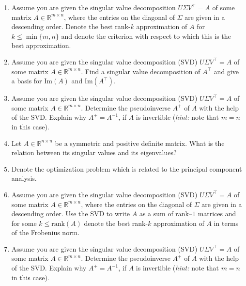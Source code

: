 \begin{enumerate}
	\item Assume you are given the singular value decomposition 
	$U \Sigma V^\top = A$ of some matrix $A \in \mathbb{R}^{m \times n}$, where the 
	entries on the diagonal of $\Sigma$ are given in a descending order.
	Denote the best rank-$k$ approximation of $A$ for $k \leq \min\{m,n\}$ and denote the criterion with respect to which this is the best approximation. 
	\item Assume you are given the singular value decomposition (SVD) $U \Sigma V^\top = A$ of some matrix $A \in \mathbb{R}^{m \times n}$. Find a singular value decomposition of $A^\top$ and give a basis for $\text{Im}(A)$ and $\text{Im}(A^\top)$.
	\item Assume you are given the singular value decomposition (SVD)
	$U \Sigma V^\top = A$ of some matrix $A \in \mathbb{R}^{m \times n}$. Determine the pseudoinverse $A^+$ of $A$ with the help of the SVD. Explain why $A^+ = A^{-1}$, if $A$ is invertible (\textit{hint:} note that $m=n$ in this case).
\item Let $A \in \mathbb{R}^{n \times n}$ be a symmetric and positive definite matrix. What is the relation between its singular values and its eigenvalues?
\item Denote the optimization problem which is related to the principal component analysis.
\item Assume you are given the singular value decomposition (SVD)
$U \Sigma V^\top = A$ of some matrix $A \in \mathbb{R}^{m \times n}$, where the 
entries on the diagonal of $\Sigma$ are given in a descending order. Use the SVD to write $A$ as a sum of rank--$1$ matrices and for some $k \leq \text{rank}(A)$ denote the best rank-$k$ approximation of $A$ in terms of the Frobenius norm.
\item Assume you are given the singular value decomposition (SVD)
$U \Sigma V^\top = A$ of some matrix $A \in \mathbb{R}^{m \times n}$. Determine the pseudoinverse $A^+$ of $A$ with the help of the SVD. Explain why $A^+ = A^{-1}$, if $A$ is invertible (\textit{hint:} note that $m=n$ in this case).
\end{enumerate}
 